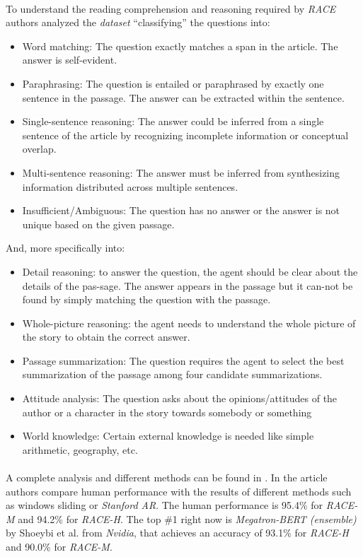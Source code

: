 \paragraph{}
To understand the reading comprehension and reasoning required by \emph{RACE} authors analyzed the \emph{dataset} ``classifying'' the questions into:
\begin{itemize}
	\item Word  matching: The  question  exactly matches a span in the article. The answer is self-evident.
	\item Paraphrasing: The question is entailed or paraphrased by exactly one sentence in the passage. The answer can be extracted within the sentence.
	\item Single-sentence reasoning: The answer could be inferred from a single sentence of the article by recognizing incomplete information or conceptual overlap.
	\item Multi-sentence reasoning: The answer must be inferred from synthesizing information distributed across multiple sentences.
	\item Insufficient/Ambiguous: The question has no answer or the answer is not unique based on the given passage.
\end{itemize}
And, more specifically into:
\begin{itemize}
\item Detail reasoning: to answer the question, the agent should be clear about the details of the pas-sage. The answer appears in the passage but it can-not be found by simply matching the question with the passage. 
\item Whole-picture reasoning: the agent needs to understand the whole picture of the story to obtain the correct answer. 
\item Passage summarization: The question requires the agent to select the best summarization of the passage among four candidate summarizations. 
\item Attitude analysis: The question asks about the opinions/attitudes of the author or a character in the story towards somebody or something
\item World knowledge: Certain external knowledge is needed like simple arithmetic, geography, etc.
\end{itemize}
\paragraph{}
A complete analysis and different methods can be found in \cite{Lai2017}. In the article authors compare human performance with the results of different methods such as windows sliding or \emph{Stanford AR}. The human performance is 95.4\% for \emph{RACE-M} and 94.2\% for \emph{RACE-H}. The top \#1 right now is \emph{Megatron-BERT (ensemble)}\cite{Shoeybi2019} by Shoeybi et al. from \emph{Nvidia}, that achieves an accuracy of 93.1\% for \emph{RACE-H}	and 90.0\% for \emph{RACE-M}.
